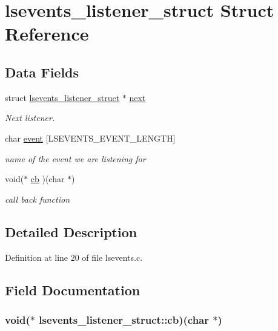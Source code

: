 \hypertarget{structlsevents__listener__struct}{
\section{lsevents\_\-listener\_\-struct Struct Reference}
\label{structlsevents__listener__struct}
}
\subsection*{Data Fields}
\begin{DoxyCompactItemize}
\item 
struct \hyperlink{structlsevents__listener__struct}{lsevents\_\-listener\_\-struct} $\ast$ \hyperlink{structlsevents__listener__struct_a8aed9196b0deab84e018b96c0cc59305}{next}
\begin{DoxyCompactList}\small\item\em Next listener. \item\end{DoxyCompactList}\item 
char \hyperlink{structlsevents__listener__struct_a270117dccadeda0164592c753dae15a1}{event} \mbox{[}LSEVENTS\_\-EVENT\_\-LENGTH\mbox{]}
\begin{DoxyCompactList}\small\item\em name of the event we are listening for \item\end{DoxyCompactList}\item 
void($\ast$ \hyperlink{structlsevents__listener__struct_a005906c1c9f0647e6ed1fb4592d8c5d0}{cb} )(char $\ast$)
\begin{DoxyCompactList}\small\item\em call back function \item\end{DoxyCompactList}\end{DoxyCompactItemize}


\subsection{Detailed Description}


Definition at line 20 of file lsevents.c.

\subsection{Field Documentation}
\hypertarget{structlsevents__listener__struct_a005906c1c9f0647e6ed1fb4592d8c5d0}{
\subsubsection[{cb}]{\setlength{\rightskip}{0pt plus 5cm}void($\ast$ {\bf lsevents\_\-listener\_\-struct::cb})(char $\ast$)}}
\label{structlsevents__listener__struct_a005906c1c9f0647e6ed1fb4592d8c5d0}


